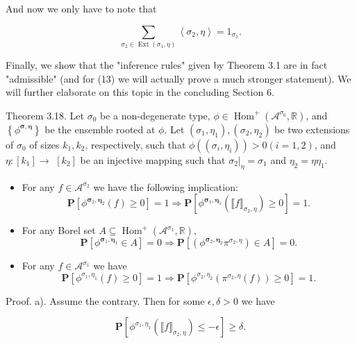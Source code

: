 \documentclass[10pt]{article}
\begin{document}
And now we only have to note that

$$
\sum_{\sigma_{2} \in \operatorname{Ext}\left(\sigma_{1}, \eta\right)}\left\langle\sigma_{2}, \eta\right\rangle=1_{\sigma_{1}} .
$$

Finally, we show that the "inference rules" given by Theorem 3.1 are in fact "admissible" (and for (13) we will actually prove a much stronger statement). We will further elaborate on this topic in the concluding Section 6.

Theorem 3.18. Let $\sigma_{0}$ be a non-degenerate type, $\phi \in \operatorname{Hom}^{+}\left(\mathcal{A}^{\sigma_{0}}, \mathbb{R}\right)$, and $\left\{\phi^{\boldsymbol{\sigma}, \boldsymbol{\eta}}\right\}$ be the ensemble rooted at $\phi$. Let $\left(\sigma_{1}, \eta_{1}\right),\left(\sigma_{2}, \eta_{2}\right)$ be two extensions of $\sigma_{0}$ of sizes $k_{1}, k_{2}$, respectively, such that $\phi\left(\left(\sigma_{i}, \eta_{i}\right)\right)>0(i=1,2)$, and $\eta:\left[k_{1}\right] \longrightarrow$ $\left[k_{2}\right]$ be an injective mapping such that $\left.\sigma_{2}\right|_{\eta}=\sigma_{1}$ and $\eta_{2}=\eta \eta_{1}$.

\begin{itemize}
  \item[a)] For any $f \in \mathcal{A}^{\sigma_{2}}$ we have the following implication:
$$
\mathbf{P}\left[\phi^{\boldsymbol{\sigma}_{2}, \boldsymbol{\eta}_{2}}(f) \geq 0\right]=1 \Longrightarrow \mathbf{P}\left[\phi^{\boldsymbol{\sigma}_{1}, \boldsymbol{\eta}_{1}}\left(\llbracket f \rrbracket_{\sigma_{2}, \eta}\right) \geq 0\right]=1 .
$$
  \item[b)] For any Borel set $A \subseteq \operatorname{Hom}^{+}\left(\mathcal{A}^{\sigma_{1}}, \mathbb{R}\right)$,
$$
\mathbf{P}\left[\phi^{\boldsymbol{\sigma}_{1}, \boldsymbol{\eta}_{1}} \in A\right]=0 \Longrightarrow \mathbf{P}\left[\left(\phi^{\boldsymbol{\sigma}_{2}, \boldsymbol{\eta}_{2}} \pi^{\sigma_{2}, \eta}\right) \in A\right]=0 .
$$
  \item[c)] For any $f \in \mathcal{A}^{\sigma_{1}}$ we have
$$
\mathbf{P}\left[\phi^{\sigma_{1}, \eta_{1}}(f) \geq 0\right]=1 \Longrightarrow \mathbf{P}\left[\phi^{\sigma_{2}, \eta_{2}}\left(\pi^{\sigma_{2}, \eta}(f)\right) \geq 0\right]=1 .
$$
\end{itemize}

Proof. a). Assume the contrary. Then for some $\epsilon, \delta>0$ we have

$$
\mathbf{P}\left[\phi^{\sigma_{1}, \eta_{1}}\left(\llbracket f \rrbracket_{\sigma_{2}, \eta}\right) \leq-\epsilon\right] \geq \delta .
$$
\end{document}
